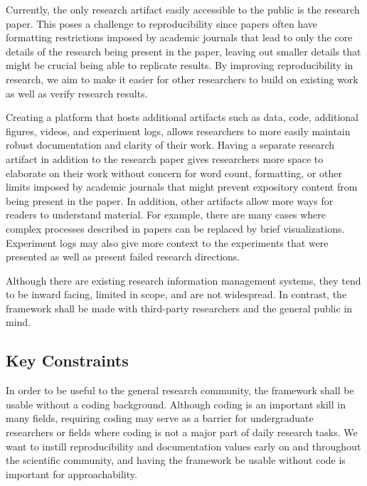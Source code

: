 Currently, the only research artifact easily accessible to the public is the research paper. This poses a challenge to \gls{reproducibility} since papers often have formatting restrictions imposed by academic journals that lead to only the core details of the research being present in the paper, leaving out smaller details that might be crucial being able to replicate results. \cite{christensen2018transparency} \cite{johnson2021evaluating} By improving \gls{reproducibility} in research, we aim to make it easier for other researchers to build on existing work as well as verify research results.

Creating a platform that hosts additional artifacts such as data, code, additional figures, videos, and experiment logs, allows researchers to more easily maintain robust documentation and clarity of their work. \cite{miyakawa_no_2020} \cite{randall2018irreproducibility} Having a separate research artifact in addition to the research paper gives researchers more space to elaborate on their work without concern for word count, formatting, or other limits imposed by academic journals that might prevent expository content from being present in the paper. \cite{christensen2018transparency} \cite{johnson2021evaluating} In addition, other artifacts allow more ways for readers to understand material. For example, there are many cases where complex processes described in papers can be replaced by brief visualizations. Experiment logs may also give more context to the experiments that were presented as well as present failed research directions. 

Although there are existing research information management systems, they tend to be inward facing, limited in scope, and are not widespread. In contrast, the framework shall be made with third-party researchers and the general public in mind. 


\subsection{Key Constraints}

In order to be useful to the general research community, the framework shall be usable without a coding background. Although coding is an important skill in many fields, requiring coding may serve as a barrier for undergraduate researchers or fields where coding is not a major part of daily research tasks. We want to instill \gls{reproducibility} and documentation values early on and throughout the scientific community, and having the framework be usable without code is important for approachability. 

